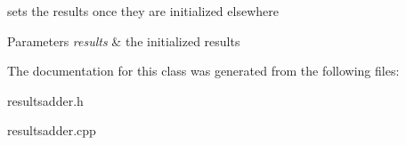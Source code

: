 sets the results once they are initialized elsewhere 


\begin{DoxyParams}{Parameters}
{\em results} & the initialized results \\
\hline
\end{DoxyParams}


The documentation for this class was generated from the following files\+:\begin{DoxyCompactItemize}
\item 
resultsadder.\+h\item 
resultsadder.\+cpp\end{DoxyCompactItemize}
